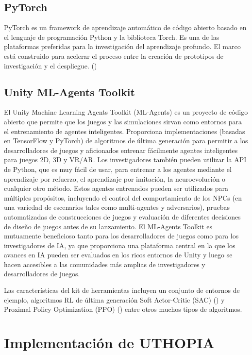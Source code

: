 \subsection{PyTorch}
 
PyTorch es un framework de aprendizaje automático de código abierto basado en el lenguaje de programación Python y la biblioteca Torch. Es una de las plataformas preferidas para la investigación del aprendizaje profundo. El marco está construido para acelerar el proceso entre la creación de prototipos de investigación y el despliegue. (\cite{NEURIPS2019_9015})
 
\subsection{Unity ML-Agents Toolkit}
 
El Unity Machine Learning Agents Toolkit (ML-Agents) es un proyecto de código abierto que permite que los juegos y las simulaciones sirvan como entornos para el entrenamiento de agentes inteligentes. Proporciona implementaciones (basadas en TensorFlow y PyTorch) de algoritmos de última generación para permitir a los desarrolladores de juegos y aficionados entrenar fácilmente agentes inteligentes para juegos 2D, 3D y VR/AR. Los investigadores también pueden utilizar la API de Python, que es muy fácil de usar, para entrenar a los agentes mediante el aprendizaje por refuerzo, el aprendizaje por imitación, la neuroevolución o cualquier otro método. Estos agentes entrenados pueden ser utilizados para múltiples propósitos, incluyendo el control del comportamiento de los NPCs (en una variedad de escenarios tales como multi-agentes y adversarios), pruebas automatizadas de construcciones de juegos y evaluación de diferentes decisiones de diseño de juegos antes de su lanzamiento. El ML-Agents Toolkit es mutuamente beneficioso tanto para los desarrolladores de juegos como para los investigadores de IA, ya que proporciona una plataforma central en la que los avances en IA pueden ser evaluados en los ricos entornos de Unity y luego se hacen accesibles a las comunidades más amplias de investigadores y desarrolladores de juegos. 
 
Las características del kit de herramientas incluyen un conjunto de entornos de ejemplo, algoritmos RL de última generación Soft Actor-Critic (SAC) (\cite{haarnoja2018soft}) y Proximal Policy Optimization (PPO) (\cite{schulman2017proximal})  entre otros muchos tipos de algoritmos.
 
\section{Implementación de UTHOPIA}
 
